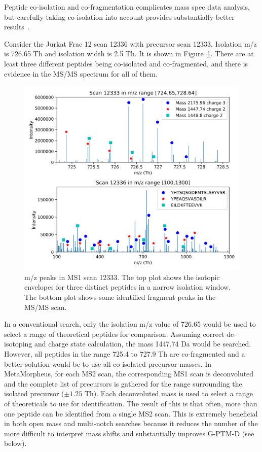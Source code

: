 \documentclass[journal=jprobs,manuscript=article]{achemso}
\begin{document}
Peptide co-isolation and co-fragmentation complicates mass spec data analysis, but carefully taking co-isolation into account provides substantially better results~\cite{Zhang2014}.

Consider the Jurkat Frac 12 scan 12336 with precursor scan 12333.
Isolation m/z is 726.65 Th and isolation width is 2.5 Th.
It is shown in Figure~\ref{fig:fig5-coIsolationSpectrum}.
There are at least three different peptides being co-isolated and co-fragmented, and there is evidence in the MS/MS spectrum for all of them.

\begin{figure}[H]
\includegraphics{fig5-coIsolationSpectrum.png}
\caption{m/z peaks in MS1 scan 12333. The top plot shows the isotopic envelopes for three distinct peptides in a narrow isolation window. The bottom plot shows some identified fragment peaks in the MS/MS scan.}
\label{fig:fig5-coIsolationSpectrum}
\end{figure}

In a conventional search, only the isolation m/z value of 726.65 would be used to select a range of theoretical peptides for comparison.
Assuming correct de-isotoping and charge state calculation, the mass 1447.74 Da would be searched.
However, all peptides in the range 725.4 to 727.9 Th are co-fragmented and a better solution would be to use all co-isolated precursor masses.
In MetaMorpheus, for each MS2 scan, the corresponding MS1 scan is deconvoluted and the complete list of precursors is gathered for the range surrounding the isolated precursor ($\pm 1.25$ Th).
Each deconvoluted mass is used to select a range of theoreticals to use for identification.
The result of this is that often, more than one peptide can be identified from a single MS2 scan.
This is extremely beneficial in both open mass and multi-notch searches because it reduces the number of the more difficult to interpret mass shifts and substantially improves G-PTM-D (see below).
\end{document}
